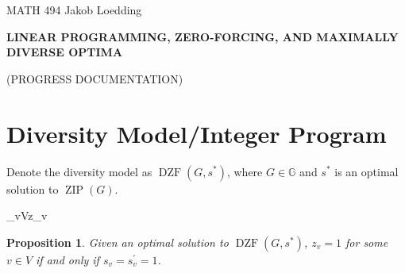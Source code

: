 \documentclass{article}
\newcommand\zip[1]{\operatorname{ZIP}\left(#1\right)}
\newcommand\dzf[1]{\operatorname{DZF}\left(#1\right)}
\newtheorem{proposition}[theorem]{Proposition}
\theoremstyle{definition}
\begin{document}
\noindent
{MATH 494}
\hfill
{
Jakob Loedding}

\vspace{.3 in}

\centerline{\large \bf  L{\small INEAR} P{\small ROGRAMMING,} Z{\small ERO-}F{\small ORCING,} {\small AND} M{\small AXIMALLY} D{\small IVERSE} O{\small PTIMA} }
\vspace{.1 in}
\centerline{\large  (P{\small ROGRESS} D{\small OCUMENTATION})}

\vspace{.2 in}

\section{Diversity Model/Integer Program}\label{sec:intro}
Denote the diversity model as $\dzf{G,s^{*}}$, where $G \in \mathbb{G}$ and $s^{*}$ is an optimal solution to $\zip{G}$.

\begin{mini!}
	{}{\sum_{v\in V}z_{v}}{}{}\label{eq:zfip-obj}
	\label{eq:zfip-const1}
	\label{eq:zfip-const2}
	\label{eq:zfip-const3}
	\label{eq:zfip-const4}
	\label{eq:zfip-const5}
	\label{eq:zfip-const6}
	\label{eq:zfip-const7}
	\label{eq:zfip-const8}
	\label{eq:zfip-const9}
	\label{eq:zfip-const10}
\end{mini!} 

\begin{proposition}
Given an optimal solution to $\dzf{G,s^{*}}$, $z_v = 1$ for some $v \in V$ if and only if $s_v = s_v^{'} = 1$.
\end{proposition}
\end{document}
